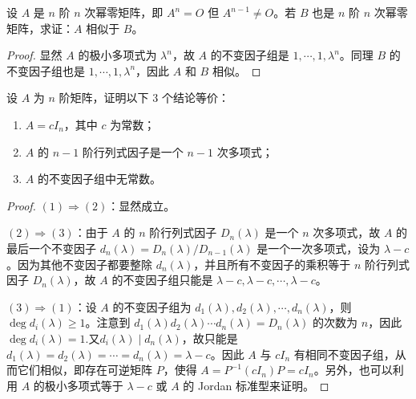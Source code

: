 \documentclass[../../main.tex]{subfiles}
\begin{document}
\begin{proposition}[同阶幂零阵必相似]\label{proposition:同阶幂零阵必相似}
设 \(A\) 是 \(n\) 阶 \(n\) 次幂零矩阵，即 \(A^n = O\) 但 \(A^{n - 1}\neq O\)。若 \(B\) 也是 \(n\) 阶 \(n\) 次幂零矩阵，求证：\(A\) 相似于 \(B\)。
\end{proposition}
\begin{proof}
显然 \(A\) 的极小多项式为 \(\lambda^n\)，故 \(A\) 的不变因子组是 \(1,\cdots,1,\lambda^n\)。同理 \(B\) 的不变因子组也是 \(1,\cdots,1,\lambda^n\)，因此 \(A\) 和 \(B\) 相似。
\end{proof}

\begin{proposition}\label{proposition:纯量阵关于不变因子和行列式因子的等价条件}
设 \(A\) 为 \(n\) 阶矩阵，证明以下 3 个结论等价：
\begin{enumerate}[(1)]
\item  \(A = cI_n\)，其中 \(c\) 为常数；

\item  \(A\) 的 \(n - 1\) 阶行列式因子是一个 \(n - 1\) 次多项式；

\item \(A\) 的不变因子组中无常数。
\end{enumerate}
\end{proposition}
\begin{proof}
\((1)\Rightarrow(2)\)：显然成立。

\((2)\Rightarrow(3)\)：由于 \(A\) 的 \(n\) 阶行列式因子 \(D_n(\lambda)\) 是一个 \(n\) 次多项式，故 \(A\) 的最后一个不变因子 \(d_n(\lambda)=D_n(\lambda)/D_{n - 1}(\lambda)\) 是一个一次多项式，设为 \(\lambda - c\)。因为其他不变因子都要整除 \(d_n(\lambda)\)，并且所有不变因子的乘积等于 \(n\) 阶行列式因子 \(D_n(\lambda)\)，故 \(A\) 的不变因子组只能是 \(\lambda - c,\lambda - c,\cdots,\lambda - c\)。 

\((3)\Rightarrow(1)\)：设 \(A\) 的不变因子组为 \(d_1(\lambda),d_2(\lambda),\cdots,d_n(\lambda)\)，则 \(\deg d_i(\lambda)\geqslant 1\)。注意到 \(d_1(\lambda)d_2(\lambda)\cdots d_n(\lambda)=D_n(\lambda)\) 的次数为 \(n\)，因此$\deg d_i(\lambda)=1$.又\(d_i(\lambda)\mid d_n(\lambda)\)，故只能是 \(d_1(\lambda)=d_2(\lambda)=\cdots=d_n(\lambda)=\lambda - c\)。因此 \(A\) 与 \(cI_n\) 有相同不变因子组，从而它们相似，即存在可逆矩阵 \(P\)，使得 \(A = P^{-1}(cI_n)P = cI_n\)。另外，也可以利用 \(A\) 的极小多项式等于 \(\lambda - c\) 或 \(A\) 的 Jordan 标准型来证明。
\end{proof}
\end{document}

